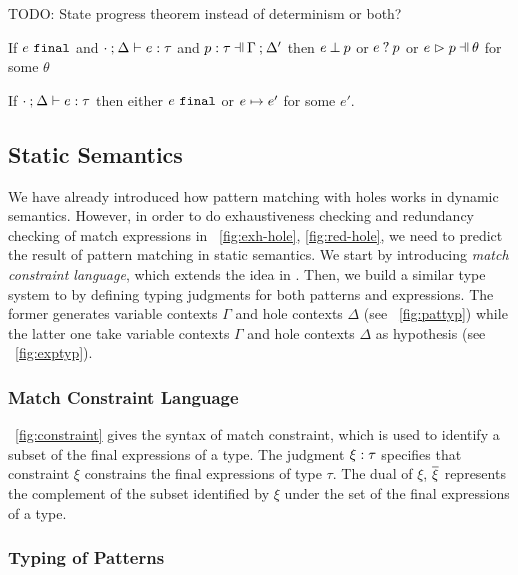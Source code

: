 \documentclass[runningheads,envcountsame,a4paper]{llncs}
\newcommand{\todo}[1]{{\color{red} TODO: #1}}
\begin{document}
\todo{State progress theorem instead of determinism or both?}

\begin{lemma}
  \label{lem:match-progress}
  If $e ~\mathtt{final}$ and $\cdot \mathbin{;} \Delta \vdash e : \tau$ and $\hpattyp{p}{\tau}{\Gamma}{\Delta'}$
  then $e \mathbin{\bot} p$ or $e \mathbin{?} p$ or $\hpatmatch{e}{p}{\theta}$ for some $\theta$
\end{lemma}

\begin{theorem}[Progress]
  \label{thrm:progress}
  If $\cdot \mathbin{;} \Delta \vdash e : \tau$ then either $e ~\mathtt{final}$ or $e \mapsto e'$ for some $e'$.
\end{theorem}

\subsection{Static Semantics}\label{sec:statics}

We have already introduced how pattern matching with holes works in dynamic
semantics. However, in order to do exhaustiveness checking and redundancy
checking of match expressions in \listfigurename~\ref{fig:exh-hole},
\ref{fig:red-hole}, we need to predict the result of pattern matching in static
semantics. We start by introducing \textit{match constraint language}, which
extends the idea in \cite{Harper2012}. Then, we build a similar type system to
\cite{DBLP:journals/pacmpl/OmarVCH19} by defining typing judgments for both
patterns and expressions. The former generates variable contexts $\Gamma$ and
hole contexts $\Delta$ (see \figurename~\ref{fig:pattyp}) while the latter one
take variable contexts $\Gamma$ and hole contexts $\Delta$ as hypothesis (see
\figurename~\ref{fig:exptyp}).

\subsubsection{Match Constraint Language}\label{sec:constraint}


\figurename~\ref{fig:constraint} gives the syntax of match constraint, which is
used to identify a subset of the final expressions of a type. The judgment
$\xi : \tau$ specifies that constraint $\xi$ constrains the final
expressions of type $\tau$. The dual of $\xi$, $\overline{\xi}$ represents the
complement of the subset identified by $\xi$ under the set of the final
expressions of a type.

\subsubsection{Typing of Patterns}

\end{document}
